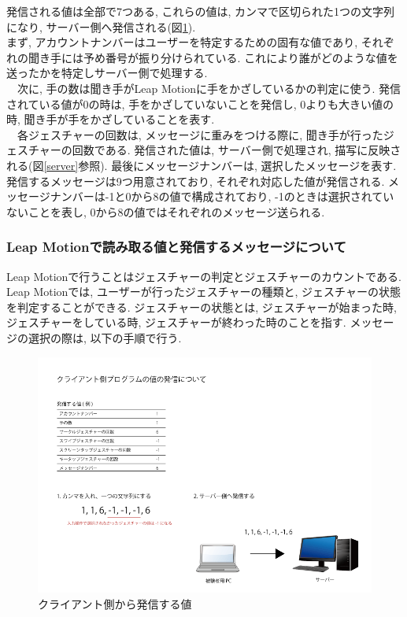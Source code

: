 \documentclass{funthesis}
\begin{document}
発信される値は全部で7つある, これらの値は, カンマで区切られた1つの文字列になり, サーバー側へ発信される(図\ref{send}).\\ 
まず, アカウントナンバーはユーザーを特定するための固有な値であり, それぞれの聞き手には予め番号が振り分けられている. これにより誰がどのような値を送ったかを特定しサーバー側で処理する. \\
　次に, 手の数は聞き手がLeap Motionに手をかざしているかの判定に使う. 発信されている値が0の時は, 手をかざしていないことを発信し, 0よりも大きい値の時, 聞き手が手をかざしていることを表す. \\
　各ジェスチャーの回数は, メッセージに重みをつける際に, 聞き手が行ったジェスチャーの回数である. 発信された値は, サーバー側で処理され, 描写に反映される(図\ref{server}参照). 
最後にメッセージナンバーは, 選択したメッセージを表す. 発信するメッセージは9つ用意されており, それぞれ対応した値が発信される. メッセージナンバーは-1と0から8の値で構成されており, -1のときは選択されていないことを表し, 0から8の値ではそれぞれのメッセージ送られる. \\

\subsubsection{Leap Motionで読み取る値と発信するメッセージについて}
Leap Motionで行うことはジェスチャーの判定とジェスチャーのカウントである.  Leap Motionでは, ユーザーが行ったジェスチャーの種類と, ジェスチャーの状態を判定することができる. ジェスチャーの状態とは, ジェスチャーが始まった時, ジェスチャーをしている時, ジェスチャーが終わった時のことを指す. メッセージの選択の際は, 以下の手順で行う. 





\begin{figure}[H]
 \begin{center}
  \includegraphics[width=120mm]{./img/sendCL.png}
 \end{center}
 \caption{クライアント側から発信する値}
 \label{send}
\end{figure}
\end{document}
